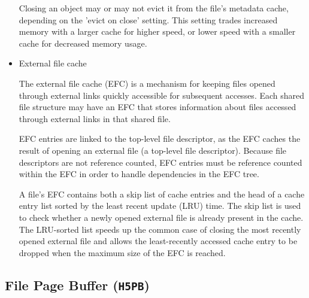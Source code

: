 \begin{itemize}
Closing an object may or may not evict it from the file's metadata cache, depending on the 'evict on close' setting. This setting trades increased memory with a larger cache for higher speed, or lower speed with a smaller cache for decreased memory usage.

    \item External file cache

The external file cache (EFC) is a mechanism for keeping files opened through external links quickly accessible for subsequent accesses. Each shared file structure may have an EFC that stores information about files accessed through external links in that shared file.

EFC entries are linked to the top-level file descriptor, as the EFC caches the result of opening an external file (a top-level file descriptor). Because file descriptors are not reference counted, EFC entries must be reference counted within the EFC in order to handle dependencies in the EFC tree.

A file's EFC contains both a skip list of cache entries and the head of a cache entry list sorted by the least recent update (LRU) time. The skip list is used to check whether a newly opened external file is already present in the cache. The LRU-sorted list speeds up the common case of closing the most recently opened external file and allows the least-recently accessed cache entry to be dropped when the maximum size of the EFC is reached.

\end{itemize}


\subsection{File Page Buffer (\texttt{H5PB})}\label{sec:H5PB}


